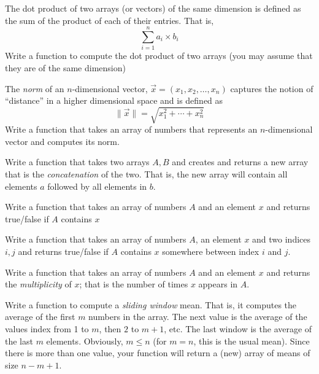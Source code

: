\begin{exer}
The dot product of two arrays (or vectors) of the same 
dimension is defined as the sum of the product of each of 
their entries.  That is, 
  $$\sum_{i=1}^n a_i \times b_i$$
Write a function to compute the dot product of two arrays 
(you may assume that they are of the same dimension)
\end{exer}

\begin{exer}
The \emph{norm} of an $n$-dimensional vector, 
$\vec{x} = (x_1, x_2, \ldots, x_n)$ captures the notion of 
``distance'' in a higher dimensional space and is defined as
  $$\|\vec{x}\| = \sqrt{x_1^2 + \cdots + x_n^2}$$
Write a function that takes an array of numbers that 
represents an $n$-dimensional vector and computes
its norm.
\end{exer}

\begin{exer}
Write a function that takes two arrays $A, B$ and creates
and returns a new array that is the \emph{concatenation}
of the two.  That is, the new array will contain all elements
$a$ followed by all elements in $b$.
\end{exer}

\begin{exer}
Write a function that takes an array of numbers $A$ 
and an element $x$ and returns true/false if $A$ contains
$x$
\end{exer}

\begin{exer}
Write a function that takes an array of numbers $A$, an 
element $x$ and two indices $i, j$ and returns true/false 
if $A$ contains $x$ somewhere between index $i$ and
$j$.
\end{exer}

\begin{exer}
Write a function that takes an array of numbers $A$ 
and an element $x$ and returns the \emph{multiplicity} of
$x$; that is the number of times $x$ appears in $A$.
\end{exer}

\begin{exer}
Write a function to compute a \emph{sliding window} 
mean.  That is, it computes the average of the first $m$ 
numbers in the array.  The next value is the average of 
the values index from 1 to $m$, then $2$ to $m+1$, etc.
The last window is the average of the last $m$ elements.  
Obviously, $m \leq n$ (for $m = n$, this is the usual mean). 
Since there is more than one value, your function will return 
a (new) array of means of size $n-m+1$.  
\end{exer}

